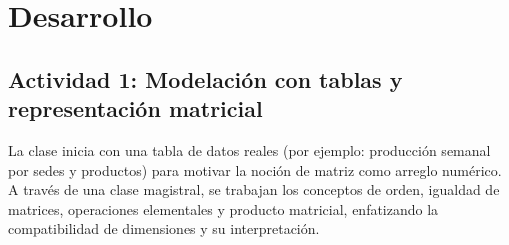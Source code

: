 \documentclass[a4,11pt]{aleph-notas}
\begin{document}
\section*{Desarrollo}  

\subsection*{Actividad 1: Modelación con tablas y representación matricial}
La clase inicia con una tabla de datos reales (por ejemplo: producción semanal por sedes y productos) para motivar la noción de matriz como arreglo numérico. A través de una clase magistral, se trabajan los conceptos de orden, igualdad de matrices, operaciones elementales y producto matricial, enfatizando la compatibilidad de dimensiones y su interpretación.
\end{document}
